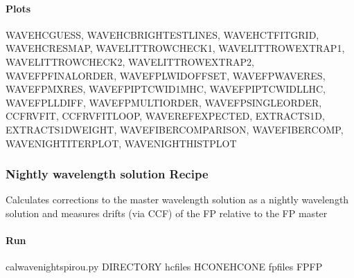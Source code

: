 \documentclass[a4paper,10pt,english]{report}
\begin{document}
\paragraph{Plots}
\label{\detokenize{user/spirou/recipes/wave_master:plots}}
\begin{sphinxVerbatim}[commandchars=\\\{\}]
WAVE\PYGZus{}HC\PYGZus{}GUESS, WAVE\PYGZus{}HC\PYGZus{}BRIGHTEST\PYGZus{}LINES, WAVE\PYGZus{}HC\PYGZus{}TFIT\PYGZus{}GRID, WAVE\PYGZus{}HC\PYGZus{}RESMAP, WAVE\PYGZus{}LITTROW\PYGZus{}CHECK1,
WAVE\PYGZus{}LITTROW\PYGZus{}EXTRAP1, WAVE\PYGZus{}LITTROW\PYGZus{}CHECK2, WAVE\PYGZus{}LITTROW\PYGZus{}EXTRAP2, WAVE\PYGZus{}FP\PYGZus{}FINAL\PYGZus{}ORDER,
WAVE\PYGZus{}FP\PYGZus{}LWID\PYGZus{}OFFSET, WAVE\PYGZus{}FP\PYGZus{}WAVE\PYGZus{}RES, WAVE\PYGZus{}FP\PYGZus{}M\PYGZus{}X\PYGZus{}RES, WAVE\PYGZus{}FP\PYGZus{}IPT\PYGZus{}CWID\PYGZus{}1MHC, WAVE\PYGZus{}FP\PYGZus{}IPT\PYGZus{}CWID\PYGZus{}LLHC,
WAVE\PYGZus{}FP\PYGZus{}LL\PYGZus{}DIFF, WAVE\PYGZus{}FP\PYGZus{}MULTI\PYGZus{}ORDER, WAVE\PYGZus{}FP\PYGZus{}SINGLE\PYGZus{}ORDER, CCF\PYGZus{}RV\PYGZus{}FIT, CCF\PYGZus{}RV\PYGZus{}FIT\PYGZus{}LOOP, WAVEREF\PYGZus{}EXPECTED,
EXTRACT\PYGZus{}S1D, EXTRACT\PYGZus{}S1D\PYGZus{}WEIGHT, WAVE\PYGZus{}FIBER\PYGZus{}COMPARISON, WAVE\PYGZus{}FIBER\PYGZus{}COMP, WAVENIGHT\PYGZus{}ITERPLOT, WAVENIGHT\PYGZus{}HISTPLOT
\end{sphinxVerbatim}


\subsubsection{Nightly wavelength solution Recipe}
\label{\detokenize{user/spirou/recipes/wave_local:nightly-wavelength-solution-recipe}}\label{\detokenize{user/spirou/recipes/wave_local:recipes-spirou-wave-local}}\label{\detokenize{user/spirou/recipes/wave_local::doc}}
Calculates corrections to the master wavelength solution as a nightly wavelength
solution and measures drifts (via CCF) of the FP relative to the FP master


\paragraph{Run}
\label{\detokenize{user/spirou/recipes/wave_local:run}}
\begin{sphinxVerbatim}[commandchars=\\\{\}]
cal\PYGZus{}wave\PYGZus{}night\PYGZus{}spirou.py \PYG{o}{[}DIRECTORY\PYG{o}{]} \PYGZhy{}hcfiles \PYG{o}{[}HCONE\PYGZus{}HCONE\PYG{o}{]} \PYGZhy{}fpfiles \PYG{o}{[}FP\PYGZus{}FP\PYG{o}{]}
\end{sphinxVerbatim}
\end{document}
